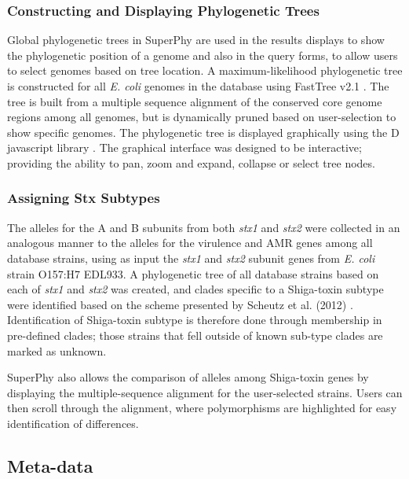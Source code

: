 \documentclass[a4paper,twoside]{article}
\begin{document}
{\subsubsection{Constructing and Displaying Phylogenetic Trees}

Global phylogenetic trees in SuperPhy are used in the results displays to show the phylogenetic position of a genome and also in the query forms, to allow users to select genomes based on tree location. A maximum-likelihood phylogenetic tree is constructed for all \textit{E. coli} genomes in the database using FastTree v2.1 \cite{price_fasttree_2010}. The tree is built from a multiple sequence alignment of the conserved core genome regions among all genomes, but is dynamically pruned based on user-selection to show specific genomes. The phylogenetic tree is displayed graphically using the D javascript library \cite{bostock2011d3}. The graphical interface was designed to be interactive; providing the ability to pan, zoom and expand, collapse or select tree nodes.

\subsubsection{Assigning Stx Subtypes}

The alleles for the A and B subunits from both \textit{stx1} and \textit{stx2} were collected in an analogous manner to the alleles for the virulence and AMR genes among all database strains, using as input the \textit{stx1} and \textit{stx2} subunit genes from \textit{E. coli} strain O157:H7 EDL933. A phylogenetic tree of all database strains based on each of \textit{stx1} and \textit{stx2} was created, and clades specific to a Shiga-toxin subtype were identified based on the scheme presented by Scheutz et al. (2012) \cite{scheutz_multicenter_2012}. Identification of Shiga-toxin subtype is therefore done through membership in pre-defined clades; those strains that fell outside of known sub-type clades are marked as unknown.

SuperPhy also allows the comparison of alleles among Shiga-toxin genes by displaying the multiple-sequence alignment for the user-selected strains. Users can then scroll through the alignment, where polymorphisms are highlighted for easy identification of differences.

\subsection{Meta-data}

}
\end{document}
